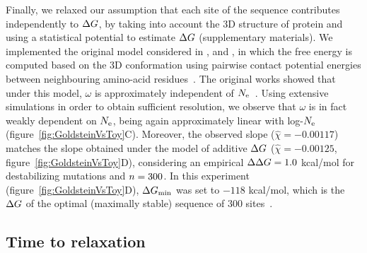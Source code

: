 \documentclass{article}
\begin{document}
Finally, we relaxed our assumption that each site of the sequence contributes independently to $\Delta G$, by taking into account the 3D structure of protein and using a statistical potential to estimate $\Delta G$ (supplementary materials).
We implemented the original model considered in \citet{Williams2006}, \citet{Goldstein2011} and \citet{Pollock2012}, in which the free energy is computed based on the 3D conformation using pairwise contact potential energies between neighbouring amino-acid residues~\citep{Miyazawa1985}.
The original works showed that under this model, $\omega$ is approximately independent of $N_{\text{e}}$~\citep{Goldstein2013}.
Using extensive simulations in order to obtain sufficient resolution, we observe that $\omega$ is in fact weakly dependent on $N_{\text{e}}$, being again approximately linear with log-$N_{\text{e}}$ (figure~\ref{fig:GoldsteinVsToy}C).
Moreover, the observed slope ($\widehat{\chi}=-0.00117$) matches the slope obtained under the model of additive $\Delta G$ ($\widehat{\chi}=-0.00125$, figure~\ref{fig:GoldsteinVsToy}D), considering an empirical $\Delta \Delta G = 1.0$ kcal/mol for destabilizing mutations and $n=300$.
In this experiment (figure~\ref{fig:GoldsteinVsToy}D), $\Delta G_{\text{min}}$ was set to $-118$ kcal/mol, which is the $\Delta G$ of the optimal (maximally stable) sequence of $300$ sites~\citep{Goldstein2011}.


\subsection{Time to relaxation}
\end{document}
